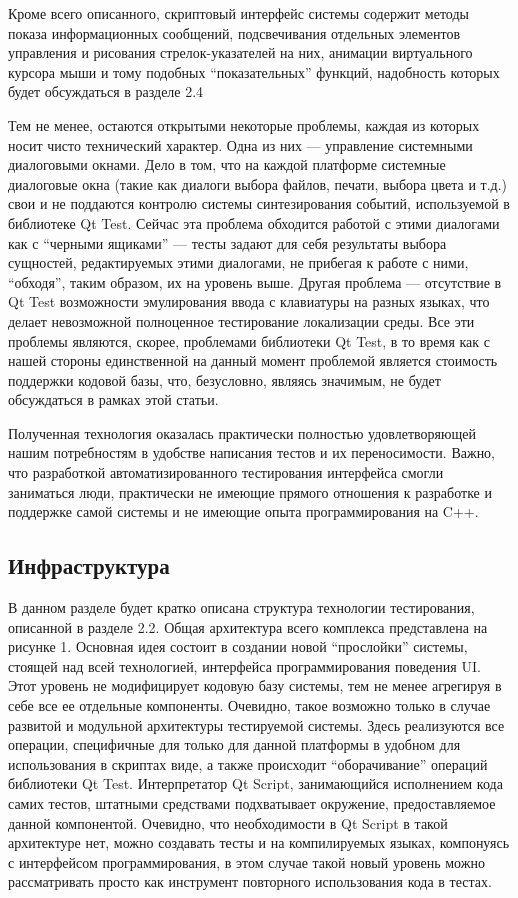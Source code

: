 ﻿\documentclass[conference]{IEEEtran}
\begin{document}
Кроме всего описанного, скриптовый интерфейс системы содержит методы показа информационных 
сообщений, подсвечивания отдельных элементов управления и рисования стрелок-указателей 
на них, анимации виртуального курсора мыши и тому подобных "`показательных"' функций, 
надобность которых будет обсуждаться в разделе 2.4

Тем не менее, остаются открытыми некоторые проблемы, каждая из которых носит чисто 
технический характер. Одна из них --- управление системными диалоговыми окнами. Дело в том, 
что на каждой платформе системные диалоговые окна (такие как диалоги выбора файлов, 
печати, выбора цвета и т.д.) свои и не поддаются контролю системы синтезирования событий, 
используемой в библиотеке Qt Test. Сейчас эта проблема обходится работой с этими диалогами 
как с "`черными ящиками"' --- тесты задают для себя результаты выбора сущностей, редактируемых 
этими диалогами, не прибегая к работе с ними, "`обходя"', таким образом, их на уровень выше. 
Другая проблема --- отсутствие в Qt Test возможности эмулирования ввода с клавиатуры 
на разных языках, что делает невозможной полноценное тестирование локализации среды. 
Все эти проблемы являются, скорее, проблемами библиотеки Qt Test, в то время как с 
нашей стороны единственной на данный момент проблемой является стоимость поддержки 
кодовой базы, что, безусловно, являясь значимым, не будет обсуждаться в рамках этой статьи.

Полученная технология оказалась практически полностью удовлетворяющей нашим потребностям 
в удобстве написания тестов и их переносимости. Важно, что разработкой автоматизированного 
тестирования интерфейса смогли заниматься люди, практически не имеющие прямого отношения 
к разработке и поддержке самой системы и не имеющие опыта программирования на C++.

\subsection{Инфраструктура}
В данном разделе будет кратко описана структура технологии тестирования, описанной 
в разделе 2.2. Общая архитектура всего комплекса представлена на рисунке 1. Основная 
идея состоит в создании новой "`прослойки"' системы, стоящей над всей технологией, 
интерфейса программирования поведения UI. Этот уровень не модифицирует кодовую базу 
системы, тем не менее агрегируя в себе все ее отдельные компоненты. Очевидно, такое 
возможно только в случае развитой и модульной архитектуры тестируемой системы. Здесь 
реализуются все операции, специфичные для только для данной платформы в удобном для 
использования в скриптах виде, а также происходит "`оборачивание"' операций библиотеки Qt Test. 
Интерпретатор Qt Script, занимающийся исполнением кода самих тестов, штатными средствами 
подхватывает окружение, предоставляемое данной компонентой. Очевидно, что необходимости в 
Qt Script в такой архитектуре нет, можно создавать тесты и на компилируемых языках, 
компонуясь с интерфейсом программирования, в этом случае такой новый уровень можно 
рассматривать просто как инструмент повторного использования кода в тестах.
\end{document}
